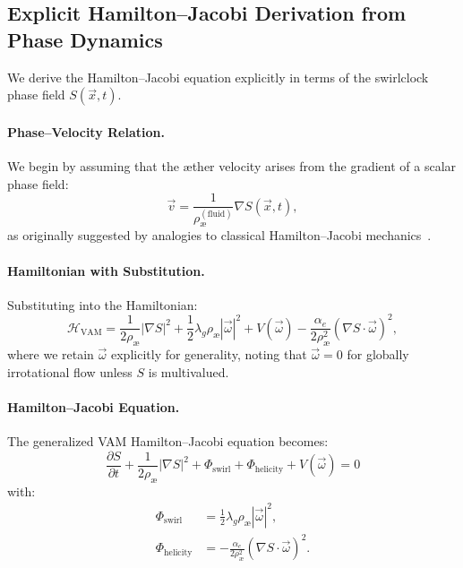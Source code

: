\subsection*{Explicit Hamilton--Jacobi Derivation from Phase Dynamics}

We derive the Hamilton--Jacobi equation explicitly in terms of the swirlclock phase field \( S(\vec{x}, t) \).

\paragraph{Phase--Velocity Relation.}
We begin by assuming that the \ae ther velocity arises from the gradient of a scalar phase field:
\begin{equation}
\vec{v} = \frac{1}{\rho_\text{\ae}^{(\text{fluid})}} \nabla S(\vec{x}, t),
\end{equation}
as originally suggested by analogies to classical Hamilton--Jacobi mechanics~\cite{arnold1998topological, moffatt1969degree}.

\paragraph{Hamiltonian with Substitution.}
Substituting into the Hamiltonian:
\begin{equation}
\mathcal{H}_\text{VAM} = \frac{1}{2 \rho_\text{\ae}} |\nabla S|^2 + \frac{1}{2} \lambda_g \rho_\text{\ae} |\vec{\omega}|^2 + V(\vec{\omega}) - \frac{\alpha_e}{2 \rho_\text{\ae}^2} (\nabla S \cdot \vec{\omega})^2,
\end{equation}
where we retain \( \vec{\omega} \) explicitly for generality, noting that \( \vec{\omega} = 0 \) for globally irrotational flow unless \( S \) is multivalued.

\paragraph{Hamilton--Jacobi Equation.}
The generalized VAM Hamilton--Jacobi equation becomes:
\begin{equation}
\boxed{
\frac{\partial S}{\partial t} + \frac{1}{2 \rho_\text{\ae}} |\nabla S|^2 + \Phi_\text{swirl} + \Phi_\text{helicity} + V(\vec{\omega}) = 0
}
\end{equation}
with:
\begin{align*}
\Phi_\text{swirl} &= \frac{1}{2} \lambda_g \rho_\text{\ae} |\vec{\omega}|^2, \\
\Phi_\text{helicity} &= -\frac{\alpha_e}{2 \rho_\text{\ae}^2} (\nabla S \cdot \vec{\omega})^2.
\end{align*}


